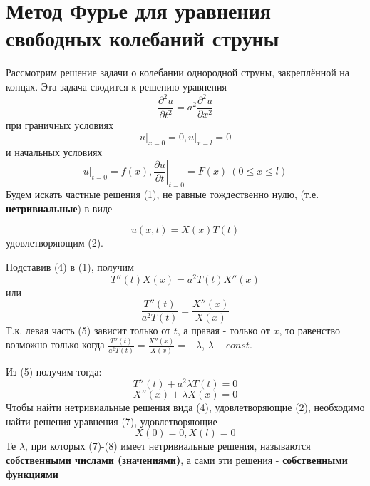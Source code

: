 \section{Метод Фурье для уравнения свободных колебаний струны}
Рассмотрим решение задачи о колебании однородной струны, закреплённой на концах. Эта задача сводится к решению уравнения
\[
	\frac{\partial^2 u}{\partial t^2} = a^2 \frac{\partial^2 u}{\partial x^2} \tag{1}
\]
при граничных условиях
\[
	\left. u\right|_{x=0} =0, \left. u\right|_{x=l}=0 \tag{2}
\]
и начальных условиях
\[
	\left. u\right|_{t=0}=f(x), \left.\frac{\partial u}{\partial t} \right|_{t=0} = F(x) ~ (0 \le x \le l) \tag{3}
\]
Будем искать частные решения (1), не равные тождественно нулю, (т.е. \textbf{нетривиальные}) в виде

\[
	u(x, t)=X(x)T(t) \tag{4}
\]
удовлетворяющим (2).

Подставив (4) в (1), получим
\[
	T''(t) X(x) = a^2 T(t) X''(x)
\]
или
\[
	\frac{T''(t)}{a^2 T(t)} = \frac{X''(x)}{X(x)} \tag{5}
\]
Т.к. левая часть (5) зависит только от $t$, а правая - только от $x$, то равенство возможно только когда $\frac{T''(t)}{a^2 T(t)}=\frac{X''(x)}{X(x)}=-\lambda$, $\lambda - const$.

Из (5) получим тогда:
\[
	T''(t) + a^2 \lambda T(t)=0 \tag{6}
\]
\[
	X''(x) + \lambda X(x) = 0 \tag{7}
\]
Чтобы найти нетривиальные решения вида (4), удовлетворяющие (2), необходимо найти решения уравнения (7), удовлетворяющие
\[
	X(0)=0, X(l)=0 \tag{8}
\]
Те $\lambda$, при которых (7)-(8) имеет нетривиальные решения, называются \textbf{собственными числами (значениями)}, а сами эти решения - \textbf{собственными функциями}


